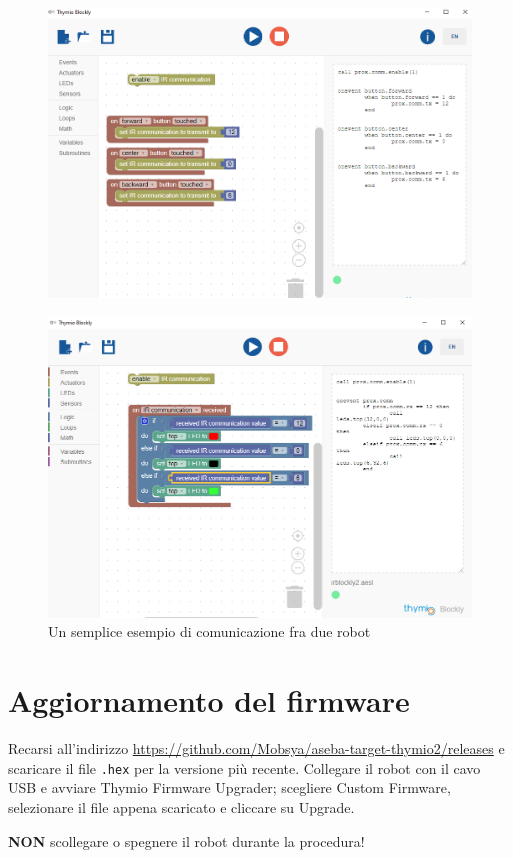 \documentclass[12pt]{article}
\begin{document}
	\begin{figure}[H]
		\includegraphics[width=\textwidth]{img/blocklyIR1.png}
		\label{blocklyIR1}
	\end{figure}
		
	\begin{figure}[H]
		\includegraphics[width=\textwidth]{img/blocklyIR2.png}
		\caption{Un semplice esempio di comunicazione fra due robot}
		\label{blocklyIR2}
	\end{figure}
	
		
\section{Aggiornamento del firmware}

	Recarsi all'indirizzo \url{https://github.com/Mobsya/aseba-target-thymio2/releases} e scaricare il file \texttt{.hex} per la versione più recente. Collegare il robot con il cavo USB e avviare Thymio Firmware Upgrader; scegliere Custom Firmware, selezionare il file appena scaricato e cliccare su Upgrade. 
	
	\textbf{NON} scollegare o spegnere il robot durante la procedura!
	
\end{document}
